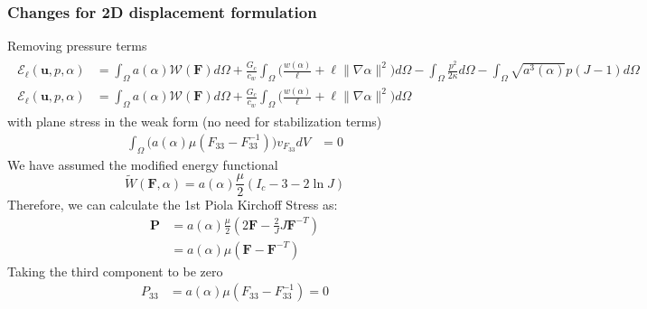 \documentclass[12pt,3p]{article}
\numberwithin{equation}{section}
\begin{document}
\subsubsection{Changes for 2D displacement formulation}
Removing pressure terms
\begin{align*}
\begin{split}
\mathcal{E}_{\ell}\left(\boldsymbol{u}, p, \alpha\right) &= \int_{\Omega} a(\alpha) \mathcal{W}(\mathbf{F}) d \Omega + \frac{G_{c}}{c_{w}} \int_{\Omega} \bigg(\frac{w(\alpha)}{\ell}+\ell\|\nabla \alpha\|^{2} \bigg) d \Omega- \int_{\Omega} \frac{p^{2}}{2 \kappa} d \Omega - \int_{\Omega} \sqrt{a^{3}(\alpha)} p(J-1) d \Omega \\
\mathcal{E}_{\ell}\left(\boldsymbol{u}, p, \alpha\right) &= \int_{\Omega} a(\alpha) \mathcal{W}(\mathbf{F}) d \Omega + \frac{G_{c}}{c_{w}} \int_{\Omega} \bigg(\frac{w(\alpha)}{\ell}+\ell\|\nabla \alpha\|^{2} \bigg) d \Omega
\end{split}
\end{align*}
with plane stress in the weak form (no need for stabilization terms)
\begin{align*}
\int_{\Omega} \big( a(\alpha) \mu (F_{33} - F_{33}^{-1}) \big) v_{F_{33}} dV &= 0
\end{align*}
We have assumed the modified energy functional
\begin{equation}
\widetilde{W} (\mathbf{F}, \alpha) = a (\alpha) \frac{\mu}{2} (I_c - 3 - 2 \ln J) 
\end{equation}
Therefore, we can calculate the 1st Piola Kirchoff Stress as:
\begin{align*}
\mathbf{P} &= a (\alpha) \frac{\mu}{2} (2 \mathbf{F} - \frac{2}{J} J \mathbf{F}^{-T}) \\
		&= a (\alpha) \mu (\mathbf{F} - \mathbf{F}^{-T})
\end{align*}
Taking the third component to be zero
\begin{align*}
P_{33} &= a(\alpha) \mu (F_{33} - F_{33}^{-1}) = 0 
\end{align*}
\end{document}

